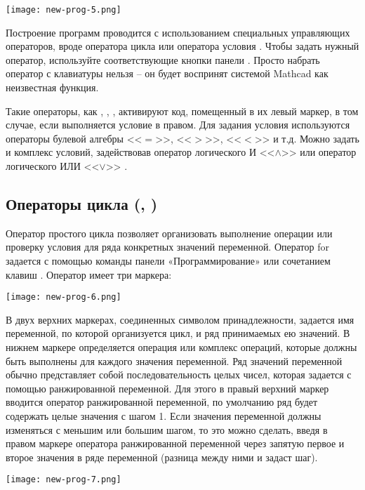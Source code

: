 \begin{center}
	\texttt{[image: new-prog-5.png]}
\end{center}

Построение программ проводится с использованием специальных управляющих операторов, вроде оператора цикла  или оператора условия . Чтобы задать нужный оператор, используйте соответствующие кнопки панели . Просто набрать оператор с клавиатуры нельзя – он будет воспринят системой Mathcad как неизвестная функция.

Такие операторы, как , , , активируют код, помещенный в их левый маркер, в том случае, если выполняется условие в правом. Для задания условия используются операторы булевой алгебры <<$=$>>, <<$>$>>, <<$<$>> и т.д. Можно задать и комплекс условий, задействовав оператор логического И <<$\land$>> или оператор логического ИЛИ <<$\lor$>> .

\subsection*{Операторы цикла (, )}

Оператор простого цикла  позволяет организовать выполнение операции или проверку условия для ряда конкретных значений переменной. Оператор for задается с помощью команды панели «Программирование» или сочетанием клавиш . Оператор  имеет три маркера:
\begin{center}
	\texttt{[image: new-prog-6.png]}
\end{center}


В двух верхних маркерах, соединенных символом принадлежности, задается имя переменной, по которой организуется цикл, и ряд принимаемых ею значений. В нижнем маркере определяется операция или комплекс операций, которые должны быть выполнены для каждого значения переменной. Ряд значений переменной обычно представляет собой последовательность целых чисел, которая задается с помощью ранжированной переменной. Для этого в правый верхний маркер вводится оператор ранжированной переменной, по умолчанию ряд будет содержать целые значения с шагом 1. Если значения переменной должны изменяться с меньшим или большим шагом, то это можно сделать, введя в правом маркере оператора ранжированной переменной через запятую первое и второе значения в ряде переменной (разница между ними и задаст шаг).
\begin{center}
	\texttt{[image: new-prog-7.png]}
\end{center}


